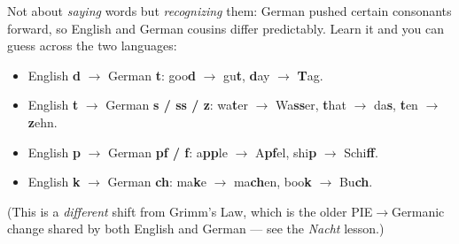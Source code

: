 Not about \emph{saying} words but \emph{recognizing} them: German pushed certain consonants forward, so English and German cousins differ predictably. Learn it and you can guess across the two languages:

\begin{itemize}
\raggedright
\setlength{\itemsep}{0.35em}
  \item English \textbf{d} $\to$ German \textbf{t}: goo\textbf{d} $\to$ gu\textbf{t}, \textbf{d}ay $\to$ \textbf{T}ag.
  \item English \textbf{t} $\to$ German \textbf{s / ss / z}: wa\textbf{t}er $\to$ Wa\textbf{ss}er, \textbf{t}hat $\to$ da\textbf{s}, \textbf{t}en $\to$ \textbf{z}ehn.
  \item English \textbf{p} $\to$ German \textbf{pf / f}: a\textbf{pp}le $\to$ A\textbf{pf}el, shi\textbf{p} $\to$ Schi\textbf{ff}.
  \item English \textbf{k} $\to$ German \textbf{ch}: ma\textbf{k}e $\to$ ma\textbf{ch}en, boo\textbf{k} $\to$ Bu\textbf{ch}.
\end{itemize}

(This is a \emph{different} shift from Grimm's Law, which is the older PIE$\to$Germanic change shared by both English and German — see the \emph{Nacht} lesson.)
